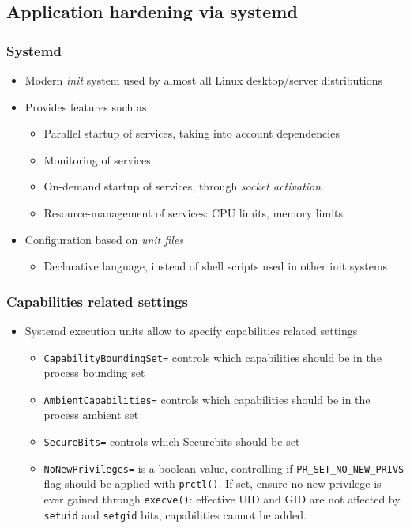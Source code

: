 \subsection{Application hardening via systemd}

\begin{frame}
	\frametitle{Systemd}
	\begin{itemize}
		\item Modern \emph{init} system used by almost all Linux
			desktop/server distributions
		\item Provides features such as
			\begin{itemize}
				\item Parallel startup of services, taking into account
					dependencies
				\item Monitoring of services
				\item On-demand startup of services, through \emph{socket activation}
				\item Resource-management of services: CPU limits, memory limits
			\end{itemize}
		\item Configuration based on \emph{unit files}
			\begin{itemize}
				\item Declarative language, instead of shell scripts used in other init
					systems
			\end{itemize}
	\end{itemize}
\end{frame}

\begin{frame}
	\frametitle{Capabilities related settings}
	\begin{itemize}
		\item Systemd execution units allow to specify capabilities related settings
			\begin{itemize}
				\item \texttt{CapabilityBoundingSet=} controls which capabilities should be
					in the process bounding set
				\item \texttt{AmbientCapabilities=} controls which capabilities should be in
					the process ambient set
				\item \texttt{SecureBits=} controls which Securebits should be set
				\item \texttt{NoNewPrivileges=} is a boolean value, controlling if
					\texttt{PR\_SET\_NO\_NEW\_PRIVS} flag should be applied with
					\texttt{prctl()}.  If set, ensure no new privilege is ever gained
					through \texttt{execve()}: effective UID and GID are not affected by
					\texttt{setuid} and \texttt{setgid} bits, capabilities cannot be
					added.
			\end{itemize}
	\end{itemize}
\end{frame}

